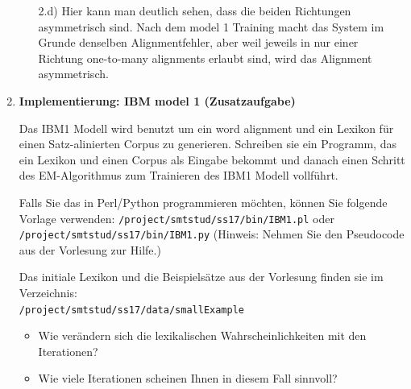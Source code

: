 \documentclass[12pt,fleqn]{article}
\begin{document}
\begin{enumerate}
\begin{enumerate}
 \vspace{0.5cm} 
2.d) Hier kann man deutlich sehen, dass die beiden Richtungen asymmetrisch sind. Nach dem model 1 Training macht das System im Grunde denselben Alignmentfehler, aber weil jeweils in nur einer Richtung one-to-many alignments erlaubt sind, wird das Alignment asymmetrisch.


\end{enumerate} 

\vspace{0.5cm} 
\item \textbf{Implementierung: IBM model 1 (Zusatzaufgabe)} 

\vspace{0.5cm} 
Das IBM1 Modell wird benutzt um ein word alignment und ein Lexikon für einen Satz-alinierten Corpus zu generieren. 
Schreiben sie ein Programm, das ein Lexikon und einen Corpus als Eingabe bekommt und danach einen Schritt des EM-Algorithmus zum Trainieren des IBM1 Modell vollführt.

\vspace{0.5cm} 
Falls Sie das in Perl/Python programmieren möchten, können Sie folgende Vorlage verwenden:
\texttt{/project/smtstud/ss17/bin/IBM1.pl} oder \texttt{/project/smtstud/ss17/bin/IBM1.py}
(Hinweis: Nehmen Sie den Pseudocode aus der Vorlesung zur Hilfe.)

\vspace{0.5cm} 
Das initiale Lexikon und die Beispielsätze aus der Vorlesung finden sie im Verzeichnis: \\ 
\texttt{/project/smtstud/ss17/data/smallExample} 

\vspace{0.5cm} 
\begin{itemize} 
 \item Wie verändern sich die lexikalischen Wahrscheinlichkeiten mit den Iterationen?
\item Wie viele Iterationen scheinen Ihnen in diesem Fall sinnvoll?
\end{itemize}

\vspace{0.5cm} 


\end{enumerate}
\end{document}
